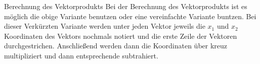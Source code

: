 \begin{b8d*}{Berechnung des Vektorprodukts}{}
    Bei der Berechnung des Vektorprodukts ist es möglich die obige Variante benutzen oder eine vereinfachte Variante buntzen. Bei dieser Verkürzten Variante werden unter jeden Vektor jeweils die $x_1$ und $x_2$ Koordinaten des Vektors nochmals notiert und die erste Zeile der Vektoren durchgestrichen. Anschließend werden dann die Koordinaten über kreuz multipliziert und dann entsprechende subtrahiert.\\
\end{b8d*}